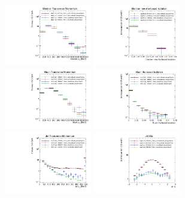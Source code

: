 \begin{figure}
\centering
\includegraphics[width=0.34\textwidth]{figures/r_hadrons/eeSR_ePt_1000GeV_10mm.pdf}
\includegraphics[width=0.34\textwidth]{figures/r_hadrons/eeSR_eIso_1000GeV_10mm.pdf}
\includegraphics[width=0.34\textwidth]{figures/r_hadrons/mumuSR_muPt_1000GeV_10mm.pdf}
\includegraphics[width=0.34\textwidth]{figures/r_hadrons/mumuSR_muIso_1000GeV_10mm.pdf}
\includegraphics[width=0.34\textwidth]{figures/r_hadrons/mumuSR_jetPt_1000GeV_10mm.pdf}
\includegraphics[width=0.34\textwidth]{figures/r_hadrons/mumuSR_jetEta_1000GeV_10mm.pdf}

\end{figure}

